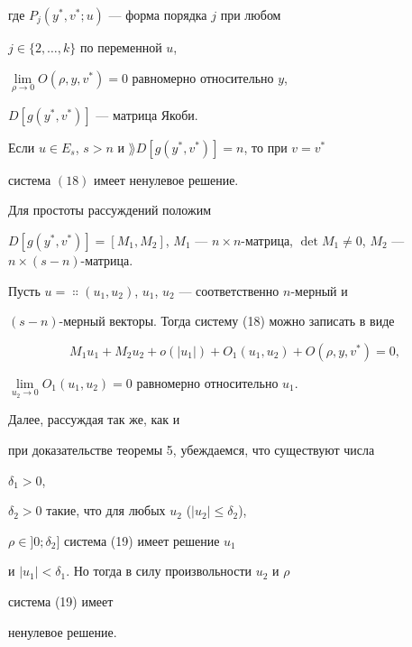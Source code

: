 где $P_j(y^*,v^*;u)$ --- форма порядка $j$ при любом 


$j\in\{2,\dotsc,k\}$ по переменной $u$, 


$\lim\limits_{\rho\to0}O(\rho,y,v^*)=0$ равномерно относительно $y$, 


$D[g(y^*,v^*)]$ --- матрица Якоби. 


 


\begin{thm} 


Если $u\in E_s$, $s>n$ и $\rang D[g(y^*,v^*)]=n$, то при $v=v^*$ 


система $(18)$ имеет ненулевое решение. 


\end{thm} 


 


\begin{pf} 


Для простоты рассуждений положим 


$D[g(y^*,v^*)]=[M_1,M_2]$, $M_1$ --- $n\times n$-матрица, $\det 


M_1\ne0$, $M_2$ --- $n\times(s{-}n)$-матрица. 


Пусть $u=\Colon(u_1,u_2)$, $u_1$, $u_2$ --- соответственно $n$-мерный и 


$(s-n)$-мерный векторы. Тогда систему (18) можно записать в виде 


\begin{equation} 


M_1u_1+M_2u_2+o(|u_1|)+O_1(u_1,u_2)+ 


O(\rho,y,v^*)=0, 


\end{equation} 


$\lim\limits_{u_2\to0}O_1(u_1,u_2)=0$ равномерно относительно $u_1$. 


Далее, рассуждая так же, как и 


при доказательстве теоремы 5, убеждаемся, что существуют числа 


$\delta_1>0$, 


$\delta_2>0$ такие, что для любых $u_2$ ($|u_2|\le\delta_2$), 


$\rho\in]0;\delta_2]$ система (19) имеет решение $u_1$ 


и $|u_1|<\delta_1$. Но тогда в силу произвольности $u_2$ и $\rho$ 


система (19) имеет 


ненулевое решение. 


\end{pf} 



